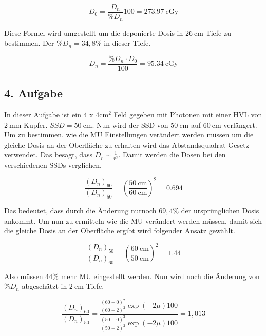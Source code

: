 \begin{equation*}
  D_0 = \frac{D_n}{\%D_n} 100 = \SI{273.97}{\centi\gray}
\end{equation*}

Diese Formel wird umgestellt um die deponierte Dosis in
$\SI{26}{\centi\meter}$ Tiefe zu bestimmen. Der $\%D_n=34,8\%$ in dieser Tiefe.

\begin{equation*}
  D_n = \frac{\%D_n \cdot D_0}{100} = \SI{95,34}{\centi\gray}
\end{equation*}

\subsection*{4. Aufgabe}

In dieser Aufgabe ist ein $4$ x $4 \si{\centi\meter\squared}$ Feld
gegeben mit Photonen mit einer HVL von $\SI{2}{\milli\meter}$ Kupfer.
$SSD=\SI{50}{\centi\meter}$. Nun wird der SSD von $\SI{50}{\centi\meter}$
auf $\SI{60}{\centi\meter}$ verlängert. Um zu bestimmen, wie die MU
Einstellungen verändert werden müssen um die gleiche Dosis an der Oberfläche
zu erhalten wird das Abstandsquadrat Gesetz verwendet. Das besagt, dass
$D_r \sim \frac{1}{r^2}$. Damit werden die Dosen bei den verschiedenen
SSDs verglichen.

\begin{equation*}
  \frac{(D_n)_{60}}{(D_n)_{50}} = \left(\frac{\SI{50}{\centi\meter}}{\SI{60}{\centi\meter}} \right)^2 = \num{0.694}
\end{equation*}

Das bedeutet, dass durch die Änderung nurnoch $69,4\%$ der ursprünglichen
Dosis ankommt. Um nun zu ermitteln wie die MU verändert werden müssen, damit sich die gleiche Dosis an der
Oberfläche ergibt wird folgender Ansatz gewählt.

\begin{equation*}
  \frac{(D_n)_{50}}{(D_n)_{60}} = \left(\frac{\SI{60}{\centi\meter}}{\SI{50}{\centi\meter}} \right)^2 = \num{1.44}
\end{equation*}

Also müssen $44\%$ mehr MU eingestellt werden.
Nun wird noch die Änderung von $\%D_n$ abgeschätzt in $\SI{2}{\centi\meter}$
Tiefe.

\begin{equation*}
  \frac{(D_n)_{60}}{(D_n)_{50}} = \frac{\frac{(60+0)^2}{(60+2)^2}\exp(-2\mu)100}{\frac{(50+0)^2}{(50+2)^2}\exp(-2\mu)100} = 1,013
\end{equation*}

